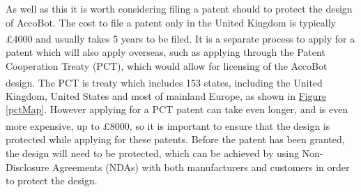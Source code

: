\documentclass[11pt]{article}		%
\newcommand{\supercite}[1]{\textsuperscript{\cite{#1}}}		%
\newcommand{\figref}[1]{\hyperref[#1]{Figure \ref*{#1}}}    %
\begin{document}
		As well as this it is worth considering filing a patent should to protect the design of AccoBot.
		The cost to file a patent only in the United Kingdom is typically £4000 and usually takes 5 years to be filed\supercite{uk2020patenting}.
		It is a separate process to apply for a patent which will also apply overseas, such as applying through the Patent Cooperation Treaty (PCT), which would allow for licensing of the AccoBot design.
		The PCT is treaty which includes 153 states\supercite{pct2020states}, including the United Kingdom, United States and most of mainland Europe, as shown in \figref{pctMap}.
		However applying for a PCT patent can take even longer, and is even more expensive, up to £8000\supercite{mewburn2020international}, so it is important to ensure that the design is protected while applying for these patents.
		Before the patent has been granted, the design will need to be protected, which can be achieved by using Non-Disclosure Agreements (NDAs) with both manufacturers and customers in order to protect the design.
		
\end{document}

